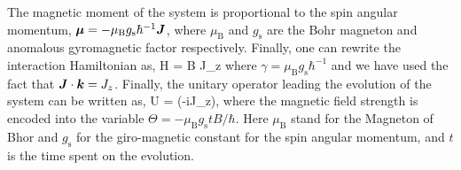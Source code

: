 The magnetic moment of the system is proportional to the spin angular momentum, $\boldsymbol{\mu}=-\mu_\text{B} g_{\text{s}}\hbar^{-1} \boldsymbol{J}$, where $\mu_{\text{B}}$ and $g_{\text{s}}$ are the Bohr magneton and anomalous gyromagnetic factor respectively.
Finally, one can rewrite the interaction Hamiltonian as,
\be
  H = \gamma B J_z
\ee
where $\gamma = \mu_\text{B} g_{\text{s}}\hbar^{-1}$ and we have used the fact that $\boldsymbol{J}\cdot\boldsymbol{k}=J_z$.
Finally, the unitary operator leading the evolution of the system can be written as,
\be
  U = \exp(-i\Theta J_z),
\ee
where the magnetic field strength is encoded into the variable $\Theta=-\mu_\text{B} g_\text{s} t B/\hbar$.
Here $\mu_\text{B}$ stand for the Magneton of Bhor and $g_\text{s}$ for the giro-magnetic constant for the spin angular momentum, and $t$ is the time spent on the evolution.
